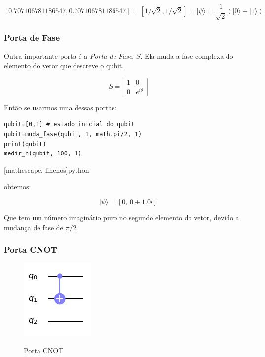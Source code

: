 \documentclass[12pt,a4paper]{article}
\begin{document}
$$[0.707106781186547, 0.707106781186547]= [1/\sqrt{2},1/\sqrt{2}]= |\psi\rangle=\frac{1}{\sqrt{2}}\left(|0\rangle+|1\rangle\right)$$

\subsubsection{Porta de Fase}
Outra importante porta é a \textit{Porta de Fase}, $S$.  Ela muda a fase complexa do elemento do vetor que descreve o qubit.

\begin{equation}
S=\left| \begin{array}{cc} 1 & 0 \\ 0 & e^{i\theta} \end{array}  \right|  
\end{equation}

Então se usarmos uma dessas portas:

\begin{verbatim}
qubit=[0,1] # estado inicial do qubit
qubit=muda_fase(qubit, 1, math.pi/2, 1)
print(qubit)
medir_n(qubit, 100, 1)
\end{verbatim}[mathescape, linenos]{python}

obtemos:

$$|\psi\rangle=[0,\, 0 + 1.0i]$$

Que tem um número imaginário puro no segundo elemento do vetor, devido a mudança de fase de $\pi/2$. 

\subsubsection{Porta CNOT}


\begin{figure}[h]
    \centering
    \includegraphics{cnot_gate.png}
    \label{fig:cnotgate}
        \caption{Porta CNOT}
\end{figure}
\end{document}
